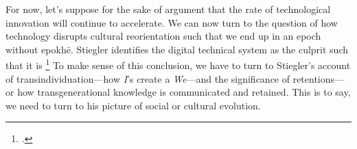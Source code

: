 \documentclass[letterpaper,notitlepage,12pt]{article}
\begin{document}
For now, let's suppose for the sake of argument that the rate of technological
innovation will continue to accelerate.
We can now turn to the question of how technology disrupts cultural
reorientation such that we end up in an epoch without epokh\={e}.
Stiegler identifies the digital technical system as the culprit such that it is
\footcite[ch.
2.8]{stiegler_age_2019}
To make sense of this conclusion, we have to turn to Stiegler's account of
transindividuation---how \textit{I}'s create a \textit{We}---and the
significance of retentions---or how transgenerational knowledge is communicated
and retained.
This is to say, we need to turn to his picture of social or cultural evolution.
\end{document}

